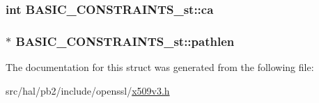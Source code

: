 \subsubsection[{\texorpdfstring{ca}{ca}}]{\setlength{\rightskip}{0pt plus 5cm}int B\+A\+S\+I\+C\+\_\+\+C\+O\+N\+S\+T\+R\+A\+I\+N\+T\+S\+\_\+st\+::ca}\hypertarget{struct_b_a_s_i_c___c_o_n_s_t_r_a_i_n_t_s__st_ab8ac4eeb5ae30bd87b9ffdef9e35c218}{}\label{struct_b_a_s_i_c___c_o_n_s_t_r_a_i_n_t_s__st_ab8ac4eeb5ae30bd87b9ffdef9e35c218}
\subsubsection[{\texorpdfstring{pathlen}{pathlen}}]{$\ast$ B\+A\+S\+I\+C\+\_\+\+C\+O\+N\+S\+T\+R\+A\+I\+N\+T\+S\+\_\+st\+::pathlen}\hypertarget{struct_b_a_s_i_c___c_o_n_s_t_r_a_i_n_t_s__st_ab0a6cfe28df8cd5f8bc4f24a3277c7b4}{}\label{struct_b_a_s_i_c___c_o_n_s_t_r_a_i_n_t_s__st_ab0a6cfe28df8cd5f8bc4f24a3277c7b4}


The documentation for this struct was generated from the following file\+:\begin{DoxyCompactItemize}
\item 
src/hal/pb2/include/openssl/\hyperlink{x509v3_8h}{x509v3.\+h}\end{DoxyCompactItemize}
